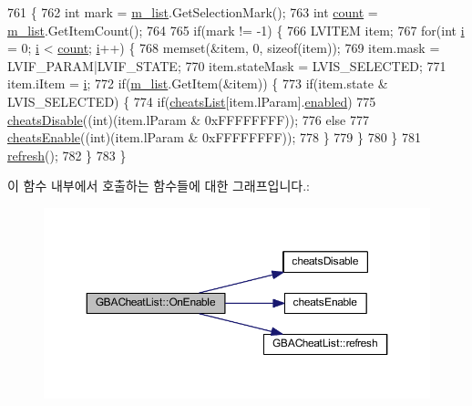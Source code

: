 \begin{DoxyCode}
761 \{
762   \textcolor{keywordtype}{int} mark = \mbox{\hyperlink{class_g_b_a_cheat_list_a00626f69b0783f81eaf76a4483ea76ed}{m\_list}}.GetSelectionMark();
763   \textcolor{keywordtype}{int} \mbox{\hyperlink{expr_8cpp_a16ff2d8e15ade4948398b0aeb80124a8}{count}} = \mbox{\hyperlink{class_g_b_a_cheat_list_a00626f69b0783f81eaf76a4483ea76ed}{m\_list}}.GetItemCount();
764   
765   \textcolor{keywordflow}{if}(mark != -1) \{
766     LVITEM item;
767     \textcolor{keywordflow}{for}(\textcolor{keywordtype}{int} \mbox{\hyperlink{expr-lex_8cpp_acb559820d9ca11295b4500f179ef6392}{i}} = 0; \mbox{\hyperlink{expr-lex_8cpp_acb559820d9ca11295b4500f179ef6392}{i}} < \mbox{\hyperlink{expr_8cpp_a16ff2d8e15ade4948398b0aeb80124a8}{count}}; \mbox{\hyperlink{expr-lex_8cpp_acb559820d9ca11295b4500f179ef6392}{i}}++) \{
768       memset(&item, 0, \textcolor{keyword}{sizeof}(item));
769       item.mask = LVIF\_PARAM|LVIF\_STATE;
770       item.stateMask = LVIS\_SELECTED;
771       item.iItem = \mbox{\hyperlink{expr-lex_8cpp_acb559820d9ca11295b4500f179ef6392}{i}};
772       \textcolor{keywordflow}{if}(\mbox{\hyperlink{class_g_b_a_cheat_list_a00626f69b0783f81eaf76a4483ea76ed}{m\_list}}.GetItem(&item)) \{
773         \textcolor{keywordflow}{if}(item.state & LVIS\_SELECTED) \{
774           \textcolor{keywordflow}{if}(\mbox{\hyperlink{_cheats_8cpp_a7c1e4a283a8eb2c21383b99633096292}{cheatsList}}[item.lParam].\mbox{\hyperlink{struct_cheats_data_a99c72fc2074645888a5afe88cfb0fd15}{enabled}})
775             \mbox{\hyperlink{_cheats_8cpp_a1615f3e49a019904e52ee98348fe918d}{cheatsDisable}}((\textcolor{keywordtype}{int})(item.lParam & 0xFFFFFFFF));
776           \textcolor{keywordflow}{else}
777             \mbox{\hyperlink{_cheats_8cpp_afb0a033fa261826873aa428ff61bad33}{cheatsEnable}}((\textcolor{keywordtype}{int})(item.lParam & 0xFFFFFFFF));
778         \}
779       \}
780     \}
781     \mbox{\hyperlink{class_g_b_a_cheat_list_a12928bb674926ae02d5a3ceb156a3b53}{refresh}}();
782   \}
783 \}
\end{DoxyCode}
이 함수 내부에서 호출하는 함수들에 대한 그래프입니다.\+:
\nopagebreak
\begin{figure}[H]
\begin{center}
\leavevmode
\includegraphics[width=350pt]{class_g_b_a_cheat_list_a22de639a60de7c74ffd176281df51b14_cgraph}
\end{center}
\end{figure}
